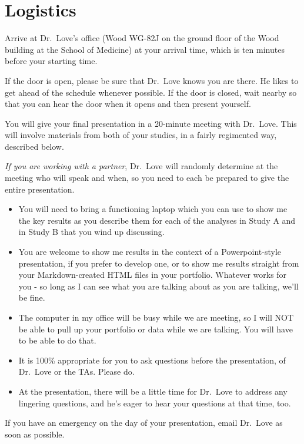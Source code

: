 \documentclass[]{book}
\providecommand{\tightlist}{%
  \setlength{\itemsep}{0pt}\setlength{\parskip}{0pt}}
\begin{document}
\hypertarget{logistics-1}{%
\section{Logistics}\label{logistics-1}}

Arrive at Dr.~Love's office (Wood WG-82J on the ground floor of the Wood building at the School of Medicine) at your arrival time, which is ten minutes before your starting time.

If the door is open, please be sure that Dr.~Love knows you are there. He likes to get ahead of the schedule whenever possible. If the door is closed, wait nearby so that you can hear the door when it opens and then present yourself.

You will give your final presentation in a 20-minute meeting with Dr.~Love. This will involve materials from both of your studies, in a fairly regimented way, described below.

\emph{If you are working with a partner}, Dr.~Love will randomly determine at the meeting who will speak and when, so you need to each be prepared to give the entire presentation.

\begin{itemize}
\tightlist
\item
  You will need to bring a functioning laptop which you can use to show me the key results as you describe them for each of the analyses in Study A and in Study B that you wind up discussing.
\item
  You are welcome to show me results in the context of a Powerpoint-style presentation, if you prefer to develop one, or to show me results straight from your Markdown-created HTML files in your portfolio. Whatever works for you - so long as I can see what you are talking about as you are talking, we'll be fine.
\item
  The computer in my office will be busy while we are meeting, so I will NOT be able to pull up your portfolio or data while we are talking. You will have to be able to do that.
\item
  It is 100\% appropriate for you to ask questions before the presentation, of Dr.~Love or the TAs. Please do.
\item
  At the presentation, there will be a little time for Dr.~Love to address any lingering questions, and he's eager to hear your questions at that time, too.
\end{itemize}

If you have an emergency on the day of your presentation, email Dr.~Love as soon as possible.
\end{document}
